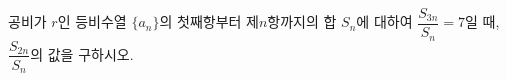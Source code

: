 공비가 $r$인 등비수열 $\{a_n\}$의 첫째항부터 제$n$항까지의 합 $S_n$에 대하여 $\dfrac{S_{3n}}{S_n}=7$일 때, $\dfrac{S_{2n}}{S_n}$의 값을 구하시오. 
